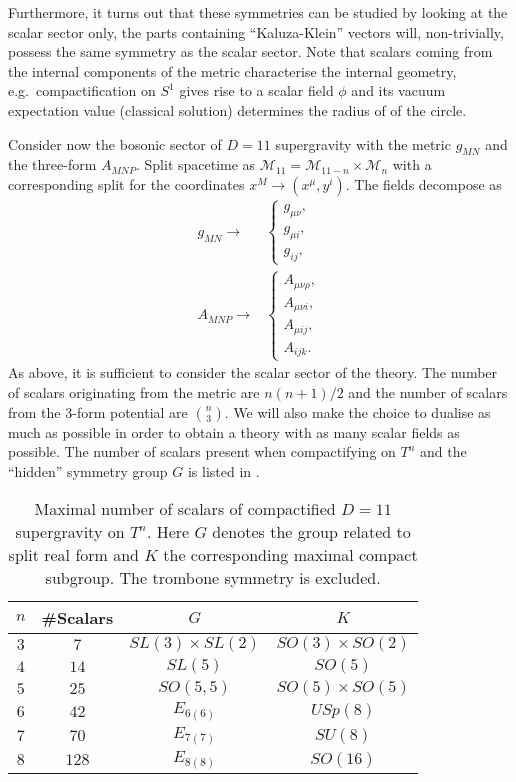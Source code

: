 Furthermore, it turns out that these symmetries can be studied by looking at the scalar sector only, the parts containing ``Kaluza-Klein'' vectors will, non-trivially, possess the same symmetry as the scalar sector. Note that scalars coming from the internal components of the metric characterise the internal geometry, e.g.\ compactification on $S^1$ gives rise to a scalar field $\phi$ and its vacuum expectation value (classical solution) determines the radius of of the circle. 

Consider now the bosonic sector of $D=11$ supergravity with the metric $g_{MN}$ and the three-form $A_{MNP}$. Split spacetime as $\mathcal{M}_{11}=\mathcal{M}_{11-n}\times\mathcal{M}_n$ with a corresponding split for the coordinates $x^M\to (x^\mu,y^i)$. The fields decompose as 
\begin{align}
        g_{MN}\to &\begin{cases}g_{\mu\nu},\\g_{\mu i},\\g_{ij},\end{cases}\\
        A_{MNP}\to &\begin{cases}A_{\mu\nu\rho},\\A_{\mu\nu i},\\A_{\mu ij},\\A_{ijk}.\end{cases}
\end{align}
As above, it is sufficient to consider the scalar sector of the theory. The number of scalars originating from the metric are $n(n+1)/2$ and the number of scalars from the $3$-form potential are ${n}\choose{3}$. We will also make the choice to dualise as much as possible in order to obtain a theory with as many scalar fields as possible. The number of scalars present when compactifying on $T^n$ and the ``hidden'' symmetry group $G$ is listed in .

\begin{table}[]
    \centering
    \caption{Maximal number of scalars of compactified $D=11$ supergravity on $T^n$. Here $G$ denotes the group related to split real form and $K$ the corresponding maximal compact subgroup. The trombone symmetry is excluded.}
    \label{tab:Scalar}
    \begin{tabular}{|c|c|c|c|}\hline
         $n$ & \#Scalars & $G$ & $K$ \\\hline
         $3$ & $7$ & $SL(3)\times SL(2)$ & $SO(3)\times SO(2)$\\\hline
         $4$ & $14$ & $SL(5)$ & $SO(5)$ \\\hline
         $5$ & $25$ & $SO(5,5)$ & $SO(5)\times SO(5)$ \\\hline
         $6$ & $42$ & $E_{6(6)}$ & $USp(8)$ \\\hline
         $7$ & $70$ & $E_{7(7)}$ & $SU(8)$ \\\hline
         $8$ & $128$ & $E_{8(8)}$ & $SO(16)$ \\\hline
    \end{tabular}
\end{table}

